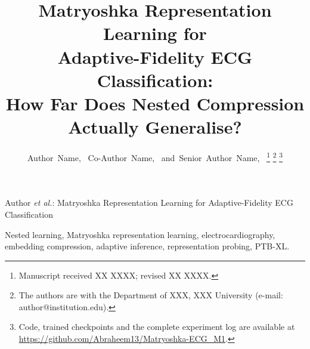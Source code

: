 \documentclass[journal,twoside]{IEEEtran}
\begin{document}
\title{Matryoshka Representation Learning for\\
Adaptive-Fidelity ECG Classification:\\
How Far Does Nested Compression Actually Generalise?}

\author{Author~Name,~
        Co-Author~Name,~
        and~Senior~Author~Name,~
\thanks{Manuscript received XX XXXX; revised XX XXXX.}
\thanks{The authors are with the Department of XXX, XXX University
(e-mail: author@institution.edu).}
\thanks{Code, trained checkpoints and the complete experiment log are
available at \url{https://github.com/Abraheem13/Matryoshka-ECG_M1}.}}

%
{Author \MakeLowercase{\textit{et al.}}: Matryoshka Representation Learning for Adaptive-Fidelity ECG Classification}

\maketitle



\begin{IEEEkeywords}
Nested learning, Matryoshka representation learning, electrocardiography,
embedding compression, adaptive inference, representation probing, PTB-XL.
\end{IEEEkeywords}









\balance


\end{document}
